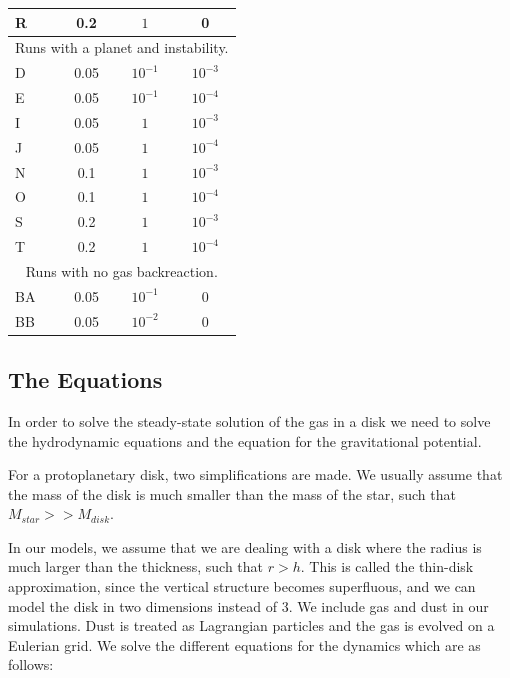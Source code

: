 \documentclass[onecolumn]{report}
\begin{document}
\begin{table}
\begin{center}
\begin{tabular}{lcc c}
      R & 0.2  & $1$       & 0\\\hline
      \multicolumn{4}{c}{\multirow{2}{*}{Runs with a planet and instability.}}\\\\\hline
      D & 0.05 & $10^{-1}$ & $10^{-3}$\\
      E & 0.05 & $10^{-1}$ & $10^{-4}$\\
      I & 0.05 & $1$       & $10^{-3}$\\
      J & 0.05 & $1$       & $10^{-4}$\\
      N & 0.1  & $1$       & $10^{-3}$\\
      O & 0.1  & $1$       & $10^{-4}$\\
      S & 0.2  & $1$       & $10^{-3}$\\
      T & 0.2  & $1$       & $10^{-4}$\\\hline
      \multicolumn{4}{c}{\multirow{2}{*}{Runs with no gas backreaction.}}\\\\\hline
      BA & 0.05 & $10^{-1}$ & 0\\
      BB & 0.05 & $10^{-2}$ & 0\\\hline
    \end{tabular}
  \end{center}
\end{table}

\newpage

\subsection{The Equations} %

In order to solve the steady-state solution of the gas in a disk we need to solve the hydrodynamic equations and the equation for the gravitational potential.

For a protoplanetary disk, two simplifications are made. We usually assume that the mass of the disk is much smaller than the mass of the star, such that $M_{star} >> M_{disk}$. 

In our models, we assume that we are dealing with a disk where the radius is much larger than the thickness, such that $r > h$. This is called the thin-disk approximation, since the vertical structure becomes superfluous, and we can model the disk in two dimensions instead of 3. We include gas and dust in our simulations. Dust is treated as Lagrangian particles and the gas is evolved on a Eulerian grid. We solve the different equations for the dynamics which are as follows:
\end{document}
